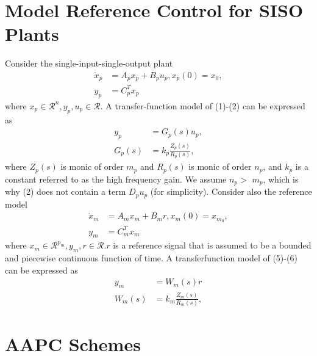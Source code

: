 \documentclass[10pt]{article}
\begin{document}
\begin{multicols*}{2}
\section{Model Reference Control for SISO Plants}
Consider the single-input-single-output plant
$$
	\begin{aligned}
		\dot{x}_p & =A_p x_p+B_p u_p, x_p(0)=x_0, \\
		y_p       & =C_p^T x_p
	\end{aligned}
$$
where $x_p \in \mathcal{R}^n, y_p, u_p \in \mathcal{R}$. A transfer-function model of (1)-(2) can be expressed as
$$
	\begin{aligned}
		y_p    & =G_p(s) u_p,                \\
		G_p(s) & =k_p \frac{Z_p(s)}{R_p(s)},
	\end{aligned}
$$
where $Z_p(s)$ is monic of order $m_p$ and $R_p(s)$ is monic of order $n_p$, and $k_p$ is a constant referred to as the high frequency gain. We assume $n_p>$ $m_p$, which is why (2) does not contain a term $D_p u_p$ (for simplicity).
Consider also the reference model
$$
	\begin{aligned}
		\dot{x}_m & =A_m x_m+B_m r, x_m(0)=x_{m_0}, \\
		y_m       & =C_m^T x_m
	\end{aligned}
$$
where $x_m \in \mathcal{R}^{p_m}, y_m, r \in \mathcal{R} . r$ is a reference signal that is assumed to be a bounded and piecewise continuous function of time. A transferfunction model of (5)-(6) can be expressed as
$$
	\begin{aligned}
		y_m    & =W_m(s) r                   \\
		W_m(s) & =k_m \frac{Z_m(s)}{R_m(s)},
	\end{aligned}
$$
\section{AAPC Schemes}

\end{multicols*}
\end{document}
